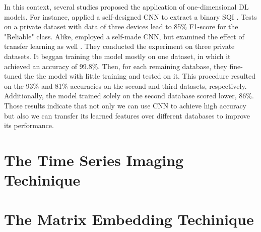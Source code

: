 In this context, several studies proposed the application of one-dimensional \acrshort{DL} models. For instance, \citeauthor{review-8} applied a self-designed \acrshort{CNN} to extract a binary \acrshort{SQI} \cite{review-8}. Tests on a private dataset with data of three devices lead to 85\% F1-score for the "Reliable" class. Alike, \citeauthor{review-9} employed a self-made \acrshort{CNN}, but examined the effect of transfer learning as well \cite{review-9}. They conducted the experiment on three private datasets. It beggan training the model mostly on one dataset, in which it achieved an accuracy of 99.8\%. Then, for each remaining database, they fine-tuned the the model with little training and tested on it. This procedure resulted on the 93\% and 81\% accuracies on the second and third datasets, respectively. Additionally, the model trained solely on the second database scored lower, 86\%. Those results indicate that not only we can use \acrshort{CNN} to achieve high accuracy but also we can transfer its learned features over different databases to improve its performance.

\section{The Time Series Imaging Techinique}
\label{sec:imaging}

\section{The Matrix Embedding Techinique}
\label{sec:matrix}
